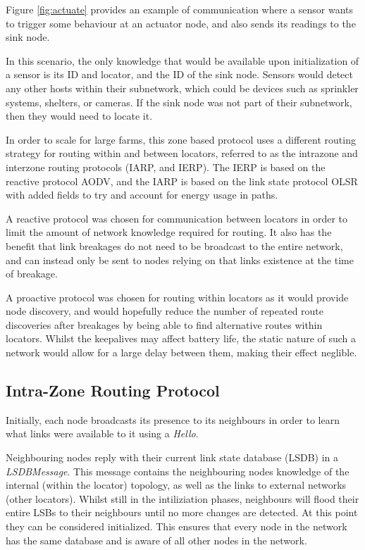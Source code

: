 \documentclass[12pt]{article}
\begin{document}
Figure \ref{fig:actuate} provides an example of communication where a sensor wants to trigger some behaviour at an actuator node, and also sends its readings to the sink node. 

In this scenario, the only knowledge that would be available upon initialization of a sensor is its ID and locator, and the ID of the sink node. Sensors would detect any other hosts within their subnetwork, which could be devices such as sprinkler systems, shelters, or cameras. If the sink node was not part of their subnetwork, then they would need to locate it.

In order to scale for large farms, this zone based protocol uses a different routing strategy for routing within and between locators, referred to as the intrazone and interzone routing protocols (IARP, and IERP). The IERP is based on the reactive protocol AODV, and the IARP is based on the link state protocol OLSR with added fields to try and account for energy usage in paths. 

A reactive protocol was chosen for communication between locators in order to limit the amount of network knowledge required for routing. It also has the benefit that link breakages do not need to be broadcast to the entire network, and can instead only be sent to nodes relying on that links existence at the time of breakage.

A proactive protocol was chosen for routing within locators as it would provide node discovery, and would hopefully reduce the number of repeated route discoveries after breakages by being able to find alternative routes within locators. Whilst the keepalives may affect battery life, the static nature of such a network would allow for a large delay between them, making their effect neglible.

\subsection{Intra-Zone Routing Protocol}

Initially, each node broadcasts its presence to its neighbours in order to learn what links were available to it using a \emph{Hello}. 

Neighbouring nodes reply with their current link state database (LSDB) in a \emph{LSDBMessage}. This message contains the neighbouring nodes knowledge of the internal (within the locator) topology, as well as the links to external networks (other locators). Whilst still in the intiliziation phases, neighbours will flood their entire LSBs to their neighbours until no more changes are detected. At this point they can be considered initialized. This ensures that every node in the network has the same database and is aware of all other nodes in the network.
\end{document}
